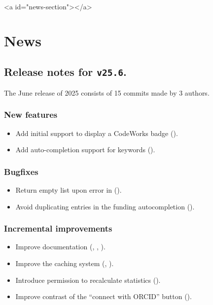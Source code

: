 \ifdefined\HCode
\begin{html}
<a id="news-section"></a>
\end{html}
\fi
\chapter*{News}

\section*{Release notes for \texttt{v25.6}.}

  The June release of 2025 consists of 15 commits made by 3 authors.

\subsection*{New features}
\begin{itemize}
\item{Add initial support to display a CodeWorks badge
    ().}
\item{Add auto-completion support for keywords
    ().}
\end{itemize}

\subsection*{Bugfixes}
\begin{itemize}
\item{Return empty list upon error in 
    ().}
\item{Avoid duplicating entries in the funding autocompletion
    ().}
\end{itemize}

\subsection*{Incremental improvements}
\begin{itemize}
\item{Improve documentation (,
    ,
    ).}
\item{Improve the caching system (,
    ).}
\item{Introduce permission to recalculate statistics
    ().}
\item{Improve contrast of the ``connect with ORCID'' button
    ().}
\end{itemize}

